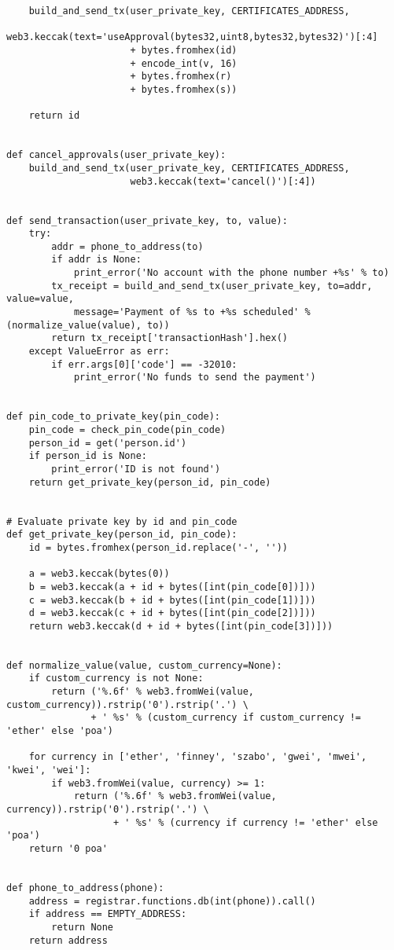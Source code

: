 \begin{verbatim}
    build_and_send_tx(user_private_key, CERTIFICATES_ADDRESS,
                      web3.keccak(text='useApproval(bytes32,uint8,bytes32,bytes32)')[:4]
                      + bytes.fromhex(id)
                      + encode_int(v, 16)
                      + bytes.fromhex(r)
                      + bytes.fromhex(s))

    return id


def cancel_approvals(user_private_key):
    build_and_send_tx(user_private_key, CERTIFICATES_ADDRESS,
                      web3.keccak(text='cancel()')[:4])


def send_transaction(user_private_key, to, value):
    try:
        addr = phone_to_address(to)
        if addr is None:
            print_error('No account with the phone number +%s' % to)
        tx_receipt = build_and_send_tx(user_private_key, to=addr, value=value,
            message='Payment of %s to +%s scheduled' % (normalize_value(value), to))
        return tx_receipt['transactionHash'].hex()
    except ValueError as err:
        if err.args[0]['code'] == -32010:
            print_error('No funds to send the payment')


def pin_code_to_private_key(pin_code):
    pin_code = check_pin_code(pin_code)
    person_id = get('person.id')
    if person_id is None:
        print_error('ID is not found')
    return get_private_key(person_id, pin_code)


# Evaluate private key by id and pin_code
def get_private_key(person_id, pin_code):
    id = bytes.fromhex(person_id.replace('-', ''))

    a = web3.keccak(bytes(0))
    b = web3.keccak(a + id + bytes([int(pin_code[0])]))
    c = web3.keccak(b + id + bytes([int(pin_code[1])]))
    d = web3.keccak(c + id + bytes([int(pin_code[2])]))
    return web3.keccak(d + id + bytes([int(pin_code[3])]))


def normalize_value(value, custom_currency=None):
    if custom_currency is not None:
        return ('%.6f' % web3.fromWei(value, custom_currency)).rstrip('0').rstrip('.') \
               + ' %s' % (custom_currency if custom_currency != 'ether' else 'poa')

    for currency in ['ether', 'finney', 'szabo', 'gwei', 'mwei', 'kwei', 'wei']:
        if web3.fromWei(value, currency) >= 1:
            return ('%.6f' % web3.fromWei(value, currency)).rstrip('0').rstrip('.') \
                   + ' %s' % (currency if currency != 'ether' else 'poa')
    return '0 poa'


def phone_to_address(phone):
    address = registrar.functions.db(int(phone)).call()
    if address == EMPTY_ADDRESS:
        return None
    return address



\end{verbatim}
